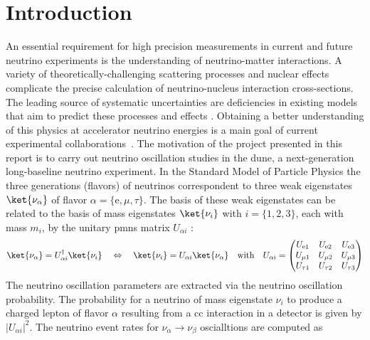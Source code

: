\section{Introduction} \label{introduction_syst} \vspace{-3mm}
An essential requirement for high precision measurements in current and future neutrino experiments is the understanding of neutrino-matter interactions. A variety of theoretically-challenging scattering processes and nuclear effects complicate the precise calculation of neutrino-nucleus interaction cross-sections. The leading source of systematic uncertainties are deficiencies in existing models that aim to predict these processes and effects \cite{Alvarez_Ruso_2018,Benhar:2013bwa,Megias:2019pol,PhysRevD.92.051302,Lu:2018stk,Munteanu:2019llq}.
Obtaining a better understanding of this physics at accelerator neutrino energies is a main goal of current experimental collaborations~\cite{Dolan:2018zye,Formaggio:2013kya,PhysRevC.94.015503,Furmanski:2016wqo,Katori:2016yel}. The motivation of the project presented in this report is to carry out neutrino oscillation studies in the \acrfull{dune}, a next-generation long-baseline neutrino experiment.
In the Standard Model of Particle Physics the three generations (flavors) of neutrinos correspondent to three weak eigenstates $\ket{\nu_\alpha}$ of flavor $\alpha = \{\text{e},\mu,\tau\}$. The basis of these weak eigenstates can be related to the basis of mass eigenstates $\ket{\nu_i}$ with $i=\{1,2,3\}$, each with mass $m_i$, by the unitary \acrshort{pmns} matrix $U_{\alpha i}$ \cite{Kayser:2005cd}:
\vspace{-4mm}%
\begin{align} \label{pmns_syst}
\ket{\nu_\alpha} =  U^\dagger_{\alpha i}\ket{\nu_i} \quad \Leftrightarrow \quad \ket{\nu_i} =  U_{\alpha i}\ket{\nu_\alpha} \quad 
\text{with} \quad U_{\alpha i} =
\begin{pmatrix}
    U_{\text{e}1} & U_{\text{e}2} & U_{\text{e}3} \\
    U_{\mu 1} & U_{\mu 2} & U_{\mu 3} \\
    U_{\tau 1} & U_{\tau 2} & U_{\tau 3}
\end{pmatrix}
\end{align}
%
The neutrino oscillation parameters are extracted via the neutrino oscillation probability. The probability for a neutrino of mass eigenstate $\nu_i$ to produce a charged lepton of flavor $\alpha$ resulting from a \acrfull{cc} interaction in a detector is given by $|U_{\alpha i}|^2$. The neutrino event rates for $\nu_\alpha \rightarrow \nu_\beta$ oscialltions are computed as \cite{doi:10.1146/annurev-nucl-101917-020930}
